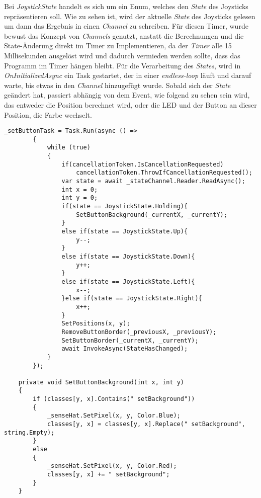 Bei \emph{JoystickState} handelt es sich um ein Enum, welches den \emph{State} des Joysticks
repräsentieren soll. Wie zu sehen ist, wird der aktuelle \emph{State} des Joysticks gelesen um
dann das Ergebnis in einen \emph{Channel} zu schreiben. Für diesen Timer, wurde bewust das
Konzept von \emph{Channels} genutzt, anstatt die Berechnungen und die State-Änderung direkt im
Timer zu Implementieren, da der \emph{Timer} alle 15 Millisekunden ausgelöst wird und dadurch
vermieden werden sollte, dass das Programm im Timer hängen bleibt.
\newline
\newline
Für die Verarbeitung des \emph{States}, wird in \emph{OnInitializedAsync} ein Task gestartet, der
in einer \emph{endless-loop} läuft und darauf warte, bis etwas in den \emph{Channel} hinzugefügt
wurde. Sobald sich der \emph{State} geändert hat, passiert abhängig von dem Event, wie folgend zu
sehen sein wird, das entweder die Position berechnet wird, oder die LED und der Button an dieser
Position, die Farbe wechselt.

\begin{lstlisting}[language={[Sharp]C}, caption=Task zum Verarbeiten des States,
    label=lst:StateTask]
        _setButtonTask = Task.Run(async () =>
        {
            while (true)
            {
                if(cancellationToken.IsCancellationRequested)
                    cancellationToken.ThrowIfCancellationRequested();
                var state = await _stateChannel.Reader.ReadAsync();
                int x = 0;
                int y = 0;
                if(state == JoystickState.Holding){
                    SetButtonBackground(_currentX, _currentY);
                }
                else if(state == JoystickState.Up){
                    y--;
                }
                else if(state == JoystickState.Down){
                    y++;
                }
                else if(state == JoystickState.Left){
                    x--;
                }else if(state == JoystickState.Right){
                    x++;
                }
                SetPositions(x, y);
                RemoveButtonBorder(_previousX, _previousY);
                SetButtonBorder(_currentX, _currentY);
                await InvokeAsync(StateHasChanged);
            }
        });

    private void SetButtonBackground(int x, int y)
    {
        if (classes[y, x].Contains(" setBackground"))
        {
            _senseHat.SetPixel(x, y, Color.Blue);
            classes[y, x] = classes[y, x].Replace(" setBackground", string.Empty);
        }
        else
        {
            _senseHat.SetPixel(x, y, Color.Red);
            classes[y, x] += " setBackground";
        }
    }
\end{lstlisting}

